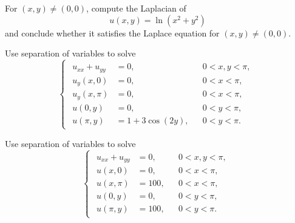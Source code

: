 \documentclass[plain]{pset}
\begin{document}
\pagebreak

\begin{problem}
For \((x, y) \neq (0, 0)\), compute the Laplacian of
\[u(x, y) = \ln\left(x^2 + y^2\right)\]
and conclude whether it satisfies the Laplace equation for \((x, y) \neq (0, 0)\).
\end{problem}
\begin{solution}
\end{solution}

\pagebreak

\begin{problem}
Use separation of variables to solve
\[
    \begin{cases}
        \begin{aligned}
            u_{xx} + u_{yy} & = 0,             &  & 0 < x, y < \pi, \\
            u_y(x, 0)       & = 0,             &  & 0 < x < \pi,    \\
            u_y(x, \pi)     & = 0,             &  & 0 < x < \pi,    \\
            u(0, y)         & = 0,             &  & 0 < y < \pi,    \\
            u(\pi, y)       & = 1 + 3\cos(2y), &  & 0 < y < \pi.
        \end{aligned}
    \end{cases}
\]
\end{problem}
\begin{solution}

\end{solution}

\pagebreak

\begin{problem}
Use separation of variables to solve
\[
    \begin{cases}
        \begin{aligned}
            u_{xx} + u_{yy} & = 0,   &  & 0 < x, y < \pi, \\
            u(x, 0)         & = 0,   &  & 0 < x < \pi,    \\
            u(x, \pi)       & = 100, &  & 0 < x < \pi,    \\
            u(0, y)         & = 0,   &  & 0 < y < \pi,    \\
            u(\pi, y)       & = 100, &  & 0 < y < \pi.
        \end{aligned}
    \end{cases}
\]
\end{problem}
\begin{solution}

\end{solution}
\end{document}
